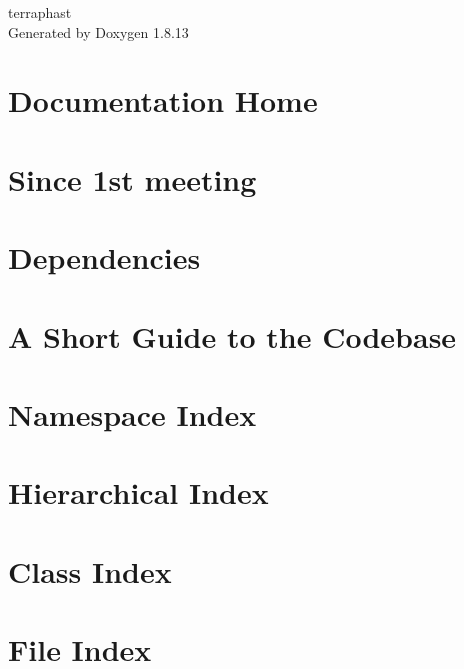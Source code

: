 \documentclass[twoside]{book}
\newcommand{\+}{\discretionary{\mbox{\scriptsize$\hookleftarrow$}}{}{}}
\newcommand{\clearemptydoublepage}{%
  \newpage{\pagestyle{empty}\cleardoublepage}%
}
\begin{document}
\hypersetup{pageanchor=false,
             bookmarksnumbered=true,
             pdfencoding=unicode
            }
\begin{titlepage}
\vspace*{7cm}
\begin{center}%
{\Large terraphast }\\
\vspace*{1cm}
{\large Generated by Doxygen 1.8.13}\\
\end{center}
\end{titlepage}
\clearemptydoublepage
{}
\tableofcontents
\clearemptydoublepage
{}
\hypersetup{pageanchor=true}

\chapter{Documentation Home}
\label{index}\hypertarget{index}{}
\chapter{Since 1st meeting}
\label{md_Changelog}

\chapter{Dependencies}
\label{md_Dependencies}

\chapter{A Short Guide to the Codebase}
\label{md_documentation_walkthrough}

\chapter{Namespace Index}

\chapter{Hierarchical Index}

\chapter{Class Index}

\chapter{File Index}

\end{document}
